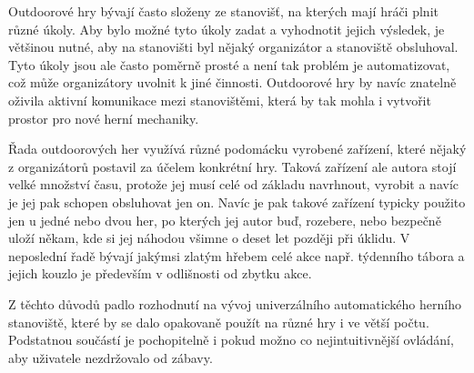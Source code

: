 Outdoorové hry bývají často složeny ze stanovišť, na kterých mají hráči plnit různé úkoly.
Aby bylo možné tyto úkoly zadat a vyhodnotit jejich výsledek, je většinou nutné, aby na stanovišti byl nějaký organizátor a stanoviště obsluhoval.
Tyto úkoly jsou ale často poměrně prosté a není tak problém je automatizovat, což může organizátory uvolnit k jiné činnosti.
Outdoorové hry by navíc znatelně oživila aktivní komunikace mezi stanovištěmi, která by tak mohla i vytvořit prostor pro nové herní mechaniky.

Řada outdoorových her využívá různé podomácku vyrobené zařízení, které nějaký z organizátorů postavil za účelem konkrétní hry.
Taková zařízení ale autora stojí velké množství času, protože jej musí celé od základu navrhnout, vyrobit a navíc je jej pak schopen obsluhovat jen on.
Navíc je pak takové zařízení typicky použito jen u jedné nebo dvou her, po kterých jej autor buď, rozebere, nebo bezpečně uloží někam, kde si jej náhodou všimne o deset let později při úklidu.
V neposlední řadě bývají jakýmsi zlatým hřebem celé akce např. týdenního tábora a jejich kouzlo je především v odlišnosti od zbytku akce.



Z těchto důvodů padlo rozhodnutí na vývoj univerzálního automatického herního stanoviště, které by se dalo opakovaně použít na různé hry i ve větší počtu.
Podstatnou součástí je pochopitelně i pokud možno co nejintuitivnější ovládání, aby uživatele nezdržovalo od zábavy.





